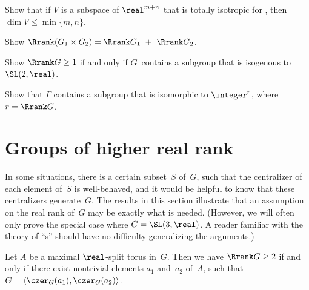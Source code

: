 \begin{exercises}
\item \label{SOmnLargestIsotropic}
Show that if $V$ is a subspace of $\real^{m+n}$ that is totally isotropic for 
, %
then $\dim V \le \min\{m,n\}$.

\item Show $ \Rrank(G_1 \times G_2) =  \Rrank G_1 \  + \ \Rrank G_2$.

\item \label{Rrank0<>SL2R}
Show $\Rrank G \ge 1$ if and only if $G$~contains a subgroup that is isogenous to $\SL(2,\real)$.

\item Show that $\Gamma$ contains a subgroup that is isomorphic to $\integer^r$, where $r = \Rrank G$.

\end{exercises}






\section{Groups of higher real rank} \label{HigherRrankSect}

In some situations, there is a certain subset~$S$
of~$G$, such that the centralizer of each
element of~$S$ is well-behaved, and it would be helpful to know
that these centralizers generate~$G$. The results in this section illustrate that an assumption on the real rank of~$G$ may be exactly
what is needed. (However, we will often only prove the special case where $G = \SL(3,\real)$. A reader familiar with the theory of ``s'' should have no difficulty generalizing the arguments.)


\begin{prop} \label{Rrank2<>C(a)gens}
Let $A$ be a maximal $\real$-split torus in~$G$. Then we have
 $\Rrank G \ge 2$
 if and only if there exist nontrivial elements $a_1$ and~$a_2$ of~$A$,
such that $G = \langle \czer_G(a_1), \czer_G(a_2)\rangle$.
\end{prop}

